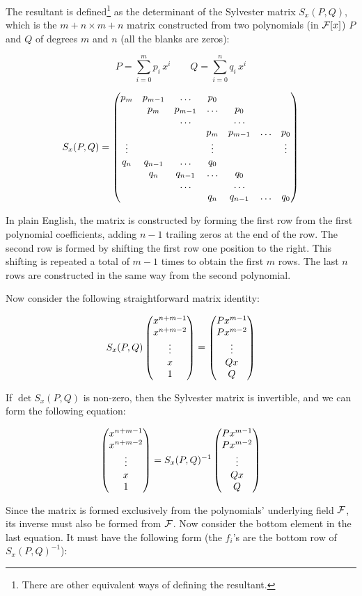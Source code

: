 The resultant is defined\footnote{There are other equivalent ways of
defining the resultant.} as the determinant of the Sylvester matrix
$S_x(P,Q)$, which is the $m+n \times m+n$ matrix constructed from two
polynomials (in ${\cal F}[x]$) $P$ and $Q$ of degrees $m$ and $n$ (all
the blanks are zeros):

$$ P = \sum_{i=0}^m p_i \, x^i \qquad Q = \sum_{i=0}^n q_i \, x^i $$

$$ S_x(P,Q) = \begin{pmatrix}
  p_m & p_{m-1} & \ldots & p_0 & & & \cr
  & p_m & p_{m-1} & \ldots & p_0 & & \cr
  & & \ldots & & \ldots & & \cr
  & & & p_m & p_{m-1} & \ldots & p_0 \cr
  \vdots & & & \vdots & & & \vdots \cr
  q_n & q_{n-1} & \ldots & q_0 & & & \cr
  & q_n & q_{n-1} & \ldots & q_0 & & \cr
  & & \ldots & & \ldots & & \cr
  & & & q_n & q_{n-1} & \ldots & q_0 \cr
  \end{pmatrix} $$

In plain English, the matrix is constructed by forming the first row
from the first polynomial coefficients, adding $n-1$ trailing zeros at
the end of the row.  The second row is formed by shifting the first
row one position to the right.  This shifting is repeated a total of
$m-1$ times to obtain the first $m$ rows.  The last $n$ rows are
constructed in the same way from the second polynomial.

Now consider the following straightforward matrix identity:

$$ S_x(P,Q) \begin{pmatrix}x^{n+m-1}\cr x^{n+m-2}\cr \vdots \cr x \cr 1\end{pmatrix}
 = \begin{pmatrix}P x^{m-1}\cr P x^{m-2}\cr \vdots \cr Q x \cr Q\end{pmatrix} $$

If $\det S_x(P,Q)$ is non-zero, then the Sylvester matrix is
invertible, and we can form the following equation:

$$ \begin{pmatrix}x^{n+m-1}\cr x^{n+m-2}\cr \vdots \cr x \cr 1\end{pmatrix}
 = S_x(P,Q)^{-1} \begin{pmatrix}P x^{m-1}\cr P x^{m-2}\cr \vdots \cr Q x \cr Q\end{pmatrix} $$

Since the matrix is formed exclusively from the polynomials'
underlying field ${\cal F}$, its inverse must also be formed from
${\cal F}$.  Now consider the bottom element in the last equation.  It
must have the following form (the $f_i$'s are the bottom row of
$S_x(P,Q)^{-1}$):

